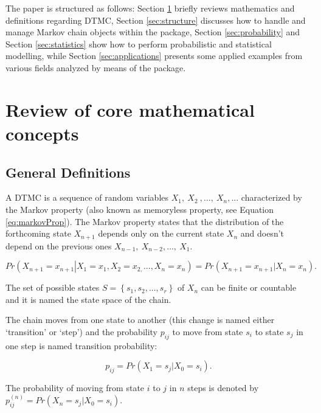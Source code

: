 \documentclass[article,nojss]{jss}
\begin{document}
The paper is structured as follows: Section \ref{sec:mathematics} briefly reviews mathematics and definitions regarding DTMC, Section \ref{sec:structure} discusses how to handle and manage Markov chain objects within the package, Section \ref{sec:probability} and Section \ref{sec:statistics} show how to perform probabilistic and statistical modelling, while Section \ref{sec:applications} presents some applied examples from various fields analyzed by means of the  package.

\hypertarget{sec:mathematics}{%
\section{Review of core mathematical concepts}\label{sec:mathematics}}

\hypertarget{general-definitions}{%
\subsection{General Definitions}\label{general-definitions}}

A DTMC is a sequence of random variables \(X_{1},\: X_{2}\: ,\ldots,\:X_{n},\ldots\) characterized by the Markov property (also known as memoryless property, see Equation \ref{eq:markovProp}). The Markov property states that the distribution of the forthcoming state \(X_{n+1}\) depends only on the current state \(X_{n}\) and doesn't depend on the previous ones \(X_{n-1},\: X_{n-2},\ldots,\: X_{1}\).

\begin{equation}
Pr\left(X_{n+1}=x_{n+1}\left|X_{1}=x_{1},X_{2}=x_{2,}...,X_{n}=x_{n}\right.\right)=Pr\left(X_{n+1}=x_{n+1}\left|X_{n}=x_{n}\right.\right).
\label{eq:markovProp}
\end{equation}

The set of possible states \(S=\left\{ s_{1},s_{2},...,s_{r}\right\}\) of \(X_{n}\) can be finite or countable and it is named the state space of the chain.

The chain moves from one state to another (this change is named either `transition' or `step') and the probability \(p_{ij}\) to move from state \(s_{i}\) to state \(s_{j}\) in one step is named transition probability:

\begin{equation}
p_{ij}=Pr\left(X_{1}=s_{j}\left|X_{0}=s_{i}\right.\right).
\label{eq:trProp}
\end{equation}

The probability of moving from state \(i\) to \(j\) in \(n\) steps is denoted by \(p_{ij}^{(n)}=Pr\left(X_{n}=s_{j}\left|X_{0}=s_{i}\right.\right)\).
\end{document}
